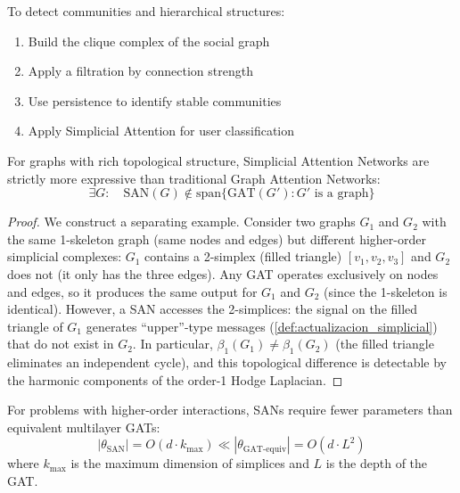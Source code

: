 \begin{application}\label{app:redes_sociales}
To detect communities and hierarchical structures:
\begin{enumerate}
    \item Build the clique complex of the social graph
    \item Apply a filtration by connection strength
    \item Use persistence to identify stable communities
    \item Apply Simplicial Attention for user classification
\end{enumerate}
\end{application}

\begin{theorem}\label{thm:poder_expresivo_sans}
For graphs with rich topological structure, Simplicial Attention Networks are strictly more expressive than traditional Graph Attention Networks:
\begin{equation}
    \exists G: \quad \text{SAN}(G) \not\in \text{span}\{\text{GAT}(G'): G' \text{ is a graph}\}
\end{equation}
\end{theorem}

\begin{proof}
We construct a separating example. Consider two graphs $G_1$ and $G_2$ with the same 1-skeleton graph (same nodes and edges) but different higher-order simplicial complexes: $G_1$ contains a 2-simplex (filled triangle) $[v_1, v_2, v_3]$ and $G_2$ does not (it only has the three edges). Any \gls{GAT} operates exclusively on nodes and edges, so it produces the same output for $G_1$ and $G_2$ (since the 1-skeleton is identical). However, a SAN accesses the 2-simplices: the signal on the filled triangle of $G_1$ generates ``upper''-type messages (\autoref{def:actualizacion_simplicial}) that do not exist in $G_2$. In particular, $\beta_1(G_1) \neq \beta_1(G_2)$ (the filled triangle eliminates an independent cycle), and this topological difference is detectable by the harmonic components of the order-1 Hodge Laplacian.
\end{proof}

\begin{corollary}\label{cor:ventaja_computacional_sans}
For problems with higher-order interactions, SANs require fewer parameters than equivalent multilayer \glspl{GAT}:
\begin{equation}
    |\theta_{\text{SAN}}| = O(d \cdot k_{\max}) \ll |\theta_{\text{GAT-equiv}}| = O(d \cdot L^2)
\end{equation}
where $k_{\max}$ is the maximum dimension of simplices and $L$ is the depth of the \gls{GAT}.
\end{corollary}

